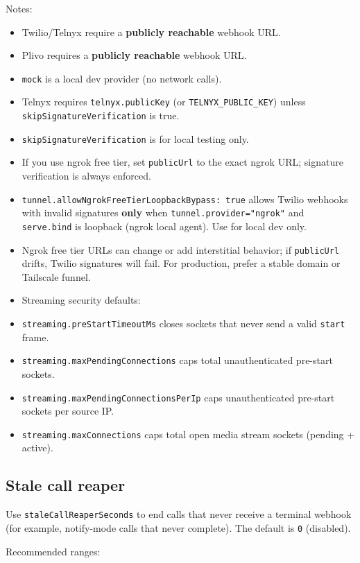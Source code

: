 Notes:

\begin{itemize}
  \item Twilio/Telnyx require a \textbf{publicly reachable} webhook URL.
  \item Plivo requires a \textbf{publicly reachable} webhook URL.
  \item \texttt{mock} is a local dev provider (no network calls).
  \item Telnyx requires \texttt{telnyx.publicKey} (or \texttt{TELNYX\_PUBLIC\_KEY}) unless \texttt{skipSignatureVerification} is true.
  \item \texttt{skipSignatureVerification} is for local testing only.
  \item If you use ngrok free tier, set \texttt{publicUrl} to the exact ngrok URL; signature verification is always enforced.
  \item \texttt{tunnel.allowNgrokFreeTierLoopbackBypass: true} allows Twilio webhooks with invalid signatures \textbf{only} when \texttt{tunnel.provider="ngrok"} and \texttt{serve.bind} is loopback (ngrok local agent). Use for local dev only.
  \item Ngrok free tier URLs can change or add interstitial behavior; if \texttt{publicUrl} drifts, Twilio signatures will fail. For production, prefer a stable domain or Tailscale funnel.
  \item Streaming security defaults:
  \item \texttt{streaming.preStartTimeoutMs} closes sockets that never send a valid \texttt{start} frame.
  \item \texttt{streaming.maxPendingConnections} caps total unauthenticated pre-start sockets.
  \item \texttt{streaming.maxPendingConnectionsPerIp} caps unauthenticated pre-start sockets per source IP.
  \item \texttt{streaming.maxConnections} caps total open media stream sockets (pending + active).
\end{itemize}


\subsection{Stale call reaper}


Use \texttt{staleCallReaperSeconds} to end calls that never receive a terminal webhook
(for example, notify-mode calls that never complete). The default is \texttt{0}
(disabled).

Recommended ranges:

